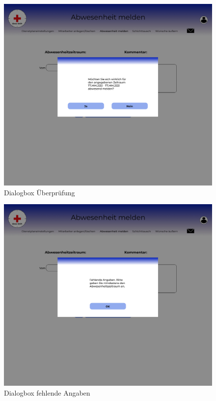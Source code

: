 \documentclass[11pt,
paper=a4,
bibtotocnumbered,	  %
liststotocnumbered,  %
DIV=calc,		  %
tablecaptionabove,	  %
headinclude,
]{article}
\begin{document}
\begin{figure}[H]
\includegraphics[width=1\textwidth]{Bilder/Screens/Abwesenheitmelden-1.jpg}{\centering}
\caption{Dialogbox Überprüfung}
\end{figure}
\begin{figure}[H]
\includegraphics[width=1\textwidth]{Bilder/Screens/Abwesenheitmelden-2.jpg}{\centering}
\caption{Dialogbox fehlende Angaben}
\end{figure}
\end{document}
